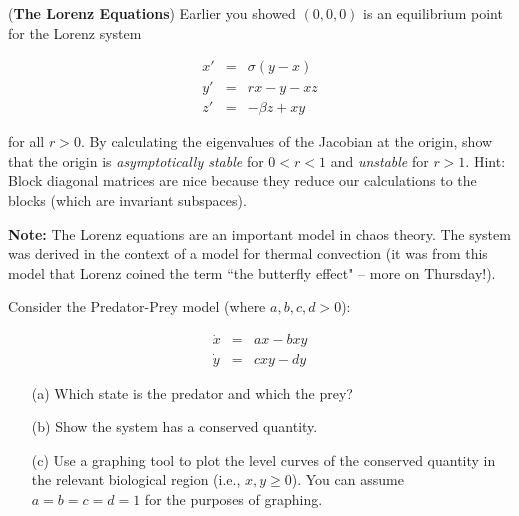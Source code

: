 \documentclass[11pt,letterpaper,boxed]{pset}
\begin{document}

\begin{problem} [Exercise 1.]
    ({\bf The Lorenz Equations}) Earlier you showed $(0,0,0)$ is an  equilibrium point for the Lorenz system
    
    \begin{eqnarray*}
        x' & = & \sigma ( y - x) \\
        y' & = & r x - y - x z \\
        z'  & = & -\beta z + x y
    \end{eqnarray*}
    
    for all $r > 0$. By calculating the eigenvalues of the Jacobian at the origin, show that the origin is {\it asymptotically stable} for $0<r<1$ and {\it unstable} for $r>1$.  Hint: Block diagonal matrices are nice because they reduce our calculations to the blocks (which are invariant subspaces).
    
    \textbf{Note:} The Lorenz equations are an important model in chaos theory. The system was derived in the context of a model for thermal convection (it was from this model that Lorenz coined the term ``the butterfly effect" -- more on Thursday!). 
\end{problem}
\newpage

\begin{problem} [Exercise 2.]
    
    Consider the Predator-Prey model (where $a,b,c,d > 0$):
    
    \begin{eqnarray*}
    \dot{x} & = & ax - b xy \\
    \dot{y}  & = & c xy - d y 
    \end{eqnarray*}
    
    \begin{enumerate}
        \item[(a)] Which state is the predator and which the prey?
        \item[(b)] Show the system has a conserved quantity.
        \item[(c)] Use a graphing tool to plot the level curves of the conserved quantity in the relevant biological region (i.e., $x,y \geq 0$).  You can assume $a=b=c=d=1$ for the purposes of graphing. 
    \end{enumerate}
\end{problem}
\newpage
\end{document}
